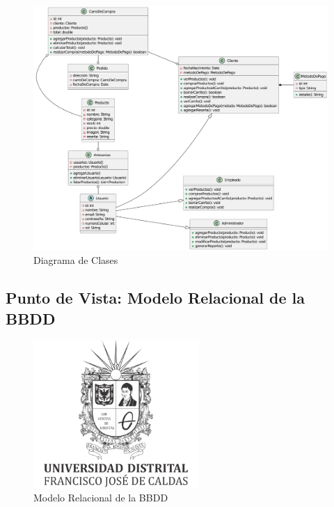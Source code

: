 \documentclass[12pt]{article}
\begin{document}
\begin{figure}[H]
    \centering
    \includegraphics[width=\textwidth]{img/DiagramaClases.pdf}
    \caption{Diagrama de Clases}
    \label{fig:diagrama_clases}
\end{figure}

\subsection{Punto de Vista: Modelo Relacional de la BBDD}
\begin{figure}[H]
    \centering
    \includegraphics[width=\textwidth]{img/ud.png}
    \caption{Modelo Relacional de la BBDD}
    \label{fig:modelo_relacional}
\end{figure}
\end{document}
